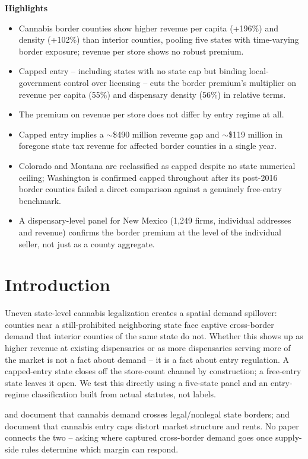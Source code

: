 \documentclass[5p]{elsarticle}
\begin{document}
\noindent\textbf{Highlights}
\begin{itemize}
\item Cannabis border counties show higher revenue per capita (+196\%) and density (+102\%) than interior
counties, pooling five states with time-varying border exposure; revenue per store shows no robust premium.
\item Capped entry -- including states with no state cap but binding local-government control over licensing
-- cuts the border premium's multiplier on revenue per capita (55\%) and dispensary density (56\%) in relative terms.
\item The premium on revenue per store does not differ by entry regime at all.
\item Capped entry implies a $\sim$\$490 million revenue gap and $\sim$\$119 million in foregone state tax
revenue for affected border counties in a single year.
\item Colorado and Montana are reclassified as capped despite no state numerical ceiling; Washington is
confirmed capped throughout after its post-2016 border counties failed a direct comparison against a
genuinely free-entry benchmark.
\item A dispensary-level panel for New Mexico (1{,}249 firms, individual addresses and revenue) confirms the
border premium at the level of the individual seller, not just as a county aggregate.
\end{itemize}

\section{Introduction}

Uneven state-level cannabis legalization creates a spatial demand spillover: counties near a still-prohibited
neighboring state face captive cross-border demand that interior counties of the same state do not. Whether
this shows up as higher revenue at existing dispensaries or as more dispensaries serving more of the market is
not a fact about demand -- it is a fact about entry regulation. A capped-entry state closes off the
store-count channel by construction; a free-entry state leaves it open. We test this directly using a
five-state panel and an entry-regime classification built from actual statutes, not labels.

\citet{HaoCowan2020} and \citet{HansenMillerWeber2020} document that cannabis demand crosses legal/nonlegal
state borders; \citet{HollenbeckUetake2021} and \citet{Thomas2019LicenseQuotas} document that cannabis entry
caps distort market structure and rents. No paper connects the two -- asking where captured cross-border
demand goes once supply-side rules determine which margin can respond.
\end{document}

